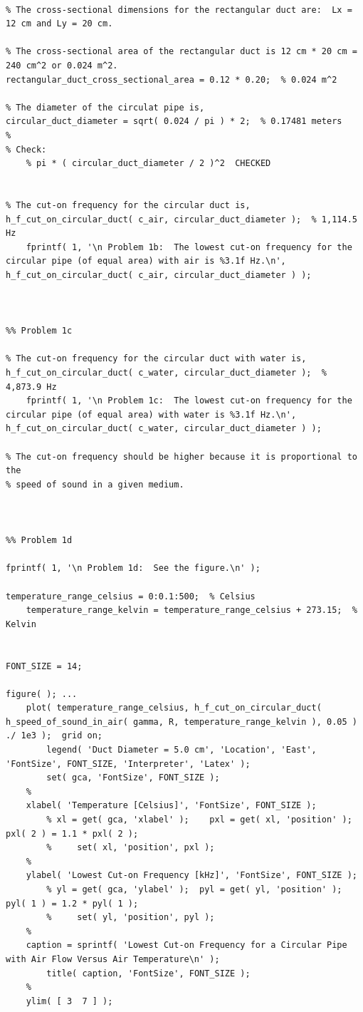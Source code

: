 \begin{lstlisting}[style=Matlab-editor, basicstyle=\mlttfamily, numbers=none, keepspaces, mlshowsectionrules]
%% Problem 1b

% The cross-sectional dimensions for the rectangular duct are:  Lx = 12 cm and Ly = 20 cm.

% The cross-sectional area of the rectangular duct is 12 cm * 20 cm = 240 cm^2 or 0.024 m^2.
rectangular_duct_cross_sectional_area = 0.12 * 0.20;  % 0.024 m^2

% The diameter of the circulat pipe is,
circular_duct_diameter = sqrt( 0.024 / pi ) * 2;  % 0.17481 meters
%
% Check:
    % pi * ( circular_duct_diameter / 2 )^2  CHECKED


% The cut-on frequency for the circular duct is,
h_f_cut_on_circular_duct( c_air, circular_duct_diameter );  % 1,114.5 Hz
    fprintf( 1, '\n Problem 1b:  The lowest cut-on frequency for the circular pipe (of equal area) with air is %3.1f Hz.\n', h_f_cut_on_circular_duct( c_air, circular_duct_diameter ) );



%% Problem 1c

% The cut-on frequency for the circular duct with water is,
h_f_cut_on_circular_duct( c_water, circular_duct_diameter );  % 4,873.9 Hz
    fprintf( 1, '\n Problem 1c:  The lowest cut-on frequency for the circular pipe (of equal area) with water is %3.1f Hz.\n', h_f_cut_on_circular_duct( c_water, circular_duct_diameter ) );

% The cut-on frequency should be higher because it is proportional to the
% speed of sound in a given medium.



%% Problem 1d

fprintf( 1, '\n Problem 1d:  See the figure.\n' );

temperature_range_celsius = 0:0.1:500;  % Celsius
    temperature_range_kelvin = temperature_range_celsius + 273.15;  % Kelvin


FONT_SIZE = 14;

figure( ); ...
    plot( temperature_range_celsius, h_f_cut_on_circular_duct( h_speed_of_sound_in_air( gamma, R, temperature_range_kelvin ), 0.05 ) ./ 1e3 );  grid on;
        legend( 'Duct Diameter = 5.0 cm', 'Location', 'East', 'FontSize', FONT_SIZE, 'Interpreter', 'Latex' );
        set( gca, 'FontSize', FONT_SIZE );
    %
    xlabel( 'Temperature [Celsius]', 'FontSize', FONT_SIZE );
        % xl = get( gca, 'xlabel' );    pxl = get( xl, 'position' );  pxl( 2 ) = 1.1 * pxl( 2 );
        %     set( xl, 'position', pxl );
    %
    ylabel( 'Lowest Cut-on Frequency [kHz]', 'FontSize', FONT_SIZE );
        % yl = get( gca, 'ylabel' );  pyl = get( yl, 'position' );  pyl( 1 ) = 1.2 * pyl( 1 );
        %     set( yl, 'position', pyl );
    %
    caption = sprintf( 'Lowest Cut-on Frequency for a Circular Pipe with Air Flow Versus Air Temperature\n' );
        title( caption, 'FontSize', FONT_SIZE );
    %
    ylim( [ 3  7 ] );



\end{lstlisting}

